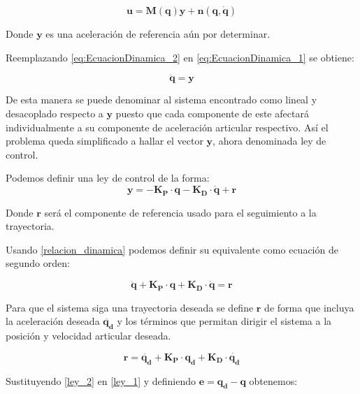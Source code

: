 \begin{equation}
    \boldsymbol{u} = \boldsymbol{M(q)y} + \boldsymbol{n(q,\dot{q})}
    \label{eq:EcuacionDinamica_2}
\end{equation}

Donde $\boldsymbol{y}$ es una aceleración de referencia aún por determinar.

Reemplazando \ref{eq:EcuacionDinamica_2} en \ref{eq:EcuacionDinamica_1} se
obtiene:

\begin{equation}
    \boldsymbol{\ddot{q}} = \boldsymbol{y}
    \label{relacion_dinamica}
\end{equation}

De esta manera se puede denominar al sistema encontrado como lineal y
desacoplado respecto a $\boldsymbol{y}$ puesto que cada componente de este
afectará individualmente a su componente de aceleración articular respectivo.
Así el problema queda simplificado a hallar el vector $\boldsymbol{y}$, ahora
denominada ley de control.

Podemos definir una ley de control de la forma:
\begin{equation}
    \boldsymbol{y}=-\boldsymbol{K_P\cdot{q}}-\boldsymbol{K_D\cdot{\dot{q}}}+\boldsymbol{r}
\end{equation}

Donde $\boldsymbol{r}$ será el componente de referencia usado para el
seguimiento a la trayectoria.

Usando \ref{relacion_dinamica} podemos definir su equivalente como ecuación de
segundo orden:

\begin{equation}
    \boldsymbol{\ddot{q}}+\boldsymbol{K_P\cdot{q}}+\boldsymbol{K_D\cdot{\dot{q}}}=\boldsymbol{r}
    \label{ley_1}
\end{equation}

Para que el sistema siga una trayectoria deseada se define $\boldsymbol{r}$ de
forma que incluya la aceleración deseada $\boldsymbol{\ddot{q_d}}$ y los
términos que permitan dirigir el sistema a la posición y velocidad articular
deseada.

\begin{equation}
    \boldsymbol{r}=
    \boldsymbol{\ddot{q_d}}+\boldsymbol{K_P\cdot{q_d}}+\boldsymbol{K_D\cdot{\dot{q_d}}}
    \label{ley_2}
\end{equation}

Sustituyendo \ref{ley_2} en \ref{ley_1} y definiendo $\boldsymbol{e} =
    \boldsymbol{q_d-q}$ obtenemos:

